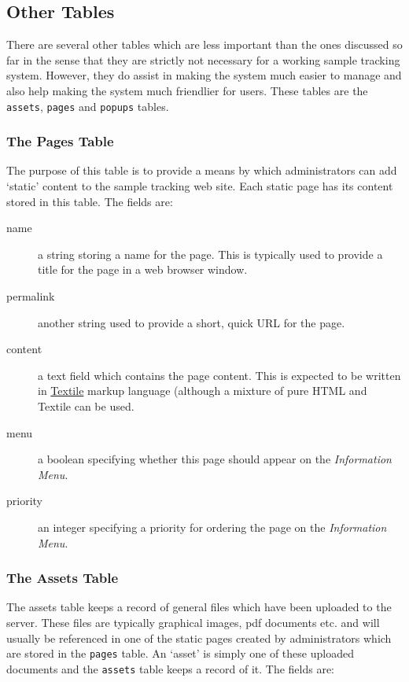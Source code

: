 \documentclass[12pt,twoside]{article}
\begin{document}
\subsection{Other Tables}
There are several other tables which are less important than the ones 
discussed so far in the sense that they are strictly not necessary for
a working sample tracking system. However, they do assist in making the
system much easier to manage and also help making the system much
friendlier for users. These tables are the \verb=assets=, \verb=pages=
and \verb=popups= tables.

\subsubsection{The Pages Table}
The purpose of this table is to provide a means by which administrators can
add `static' content to the sample tracking web site. Each static page has
its content stored in this table. The fields are:

\begin{description}
\item[name]
a string storing a name for the page. This is typically used to provide
a title for the page in a web browser window.
\item[permalink]
another string used to provide a short, quick URL for the page.
\item[content]
a text field which contains the page content. This is expected to be written
in  \href{http://en.wikipedia.org/wiki/Textile_%28markup_language%29}{Textile}
markup language (although a mixture of pure HTML and Textile can be used.
\item[menu]
a boolean specifying whether this page should appear on the
\emph{Information Menu}.
\item[priority]
an integer specifying a priority for ordering the page on the
\emph{Information Menu}.
\end{description}

\subsubsection{The Assets Table}
The assets table keeps a record of general files which have been uploaded
to the server. These files are typically graphical images, pdf documents etc.
and will usually be referenced in one of the static pages created by
administrators which are stored in the \verb=pages= table. An `asset' is
simply one of these uploaded documents and the \verb=assets= table keeps
a record of it. The fields are:
\end{document}
